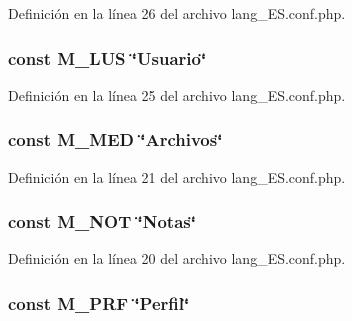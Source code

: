 Definición en la línea 26 del archivo lang\-\_\-\-E\-S.\-conf.\-php.

\hypertarget{lang__ES_8conf_8php_aa430cdb4e357c20e4c15429ebae6c5bb}{
\subsubsection[{M\-\_\-\-L\-U\-S}]{\setlength{\rightskip}{0pt plus 5cm}const M\-\_\-\-L\-U\-S \char`\"{}Usuario\char`\"{}}}\label{lang__ES_8conf_8php_aa430cdb4e357c20e4c15429ebae6c5bb}


Definición en la línea 25 del archivo lang\-\_\-\-E\-S.\-conf.\-php.

\hypertarget{lang__ES_8conf_8php_a8f62983a225a0e2c9e4c149d53adef1d}{
\subsubsection[{M\-\_\-\-M\-E\-D}]{\setlength{\rightskip}{0pt plus 5cm}const M\-\_\-\-M\-E\-D \char`\"{}Archivos\char`\"{}}}\label{lang__ES_8conf_8php_a8f62983a225a0e2c9e4c149d53adef1d}


Definición en la línea 21 del archivo lang\-\_\-\-E\-S.\-conf.\-php.

\hypertarget{lang__ES_8conf_8php_a54125c8fde2d02736eb378419d0c5e07}{
\subsubsection[{M\-\_\-\-N\-O\-T}]{\setlength{\rightskip}{0pt plus 5cm}const M\-\_\-\-N\-O\-T \char`\"{}Notas\char`\"{}}}\label{lang__ES_8conf_8php_a54125c8fde2d02736eb378419d0c5e07}


Definición en la línea 20 del archivo lang\-\_\-\-E\-S.\-conf.\-php.

\hypertarget{lang__ES_8conf_8php_acc375524bbf44b4d19de33e33c37b987}{
\subsubsection[{M\-\_\-\-P\-R\-F}]{\setlength{\rightskip}{0pt plus 5cm}const M\-\_\-\-P\-R\-F \char`\"{}Perfil\char`\"{}}}\label{lang__ES_8conf_8php_acc375524bbf44b4d19de33e33c37b987}


